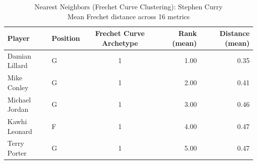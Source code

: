\begin{table}[t]
\caption*{
{\fontsize{20}{25} Nearest Neighbors (Frechet Curve Clustering): Stephen Curry\fontsize{12}{15}\selectfont } \\ 
{\fontsize{14}{17}\selectfont  Mean Frechet distance across 16 metrics\fontsize{12}{15}\selectfont }
} 
\fontsize{12.0pt}{14.0pt}\selectfont
\begin{tabular*}{\linewidth}{@{\extracolsep{\fill}}llcrr}
\toprule
Player & Position & Frechet Curve Archetype & Rank (mean) & Distance (mean) \\ 
\midrule\addlinespace[2.5pt]
Damian Lillard & G & 1 & 1.00 & 0.35 \\ 
Mike Conley & G & 1 & 2.00 & 0.41 \\ 
Michael Jordan & G & 1 & 3.00 & 0.46 \\ 
Kawhi Leonard & F & 1 & 4.00 & 0.47 \\ 
Terry Porter & G & 1 & 5.00 & 0.47 \\ 
\bottomrule
\end{tabular*}
\end{table}

